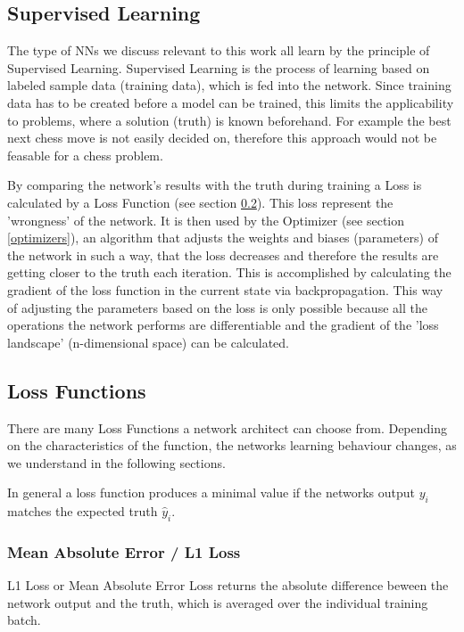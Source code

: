 \documentclass[a4paper,10pt]{scrartcl}
\begin{document}
\subsection{Supervised Learning}
\label{supervised-learning}

The type of NNs we discuss relevant to this work all learn by the principle of Supervised Learning.
Supervised Learning is the process of learning based on labeled sample data (training data), which is fed into the network.
Since training data has to be created before a model can be trained, this limits the applicability to problems, where a solution (truth) is known beforehand.
For example the best next chess move is not easily decided on, therefore this approach would not be feasable for a chess problem.

By comparing the network's results with the truth during training a Loss is calculated by a Loss Function (see section \ref{loss}).
This loss represent the 'wrongness' of the network.
It is then used by the Optimizer (see section \ref{optimizers}), an algorithm that adjusts the weights and biases (parameters) of the network in such a way, that the loss decreases and therefore the results are getting closer to the truth each iteration.
This is accomplished by calculating the gradient of the loss function in the current state via backpropagation.
This way of adjusting the parameters based on the loss is only possible because all the operations the network performs are differentiable and the gradient of the 'loss landscape' (n-dimensional space) can be calculated.

\subsection{Loss Functions}
\label{loss}

There are many Loss Functions a network architect can choose from.
Depending on the characteristics of the function, the networks learning behaviour changes, as we understand in the following sections.

In general a loss function produces a minimal value if the networks output $y_i$ matches the expected truth $\hat{y}_i$.

\subsubsection*{Mean Absolute Error / L1 Loss}

L1 Loss or Mean Absolute Error Loss returns the absolute difference beween the network output and the truth, which is averaged over the individual training batch.
\end{document}
